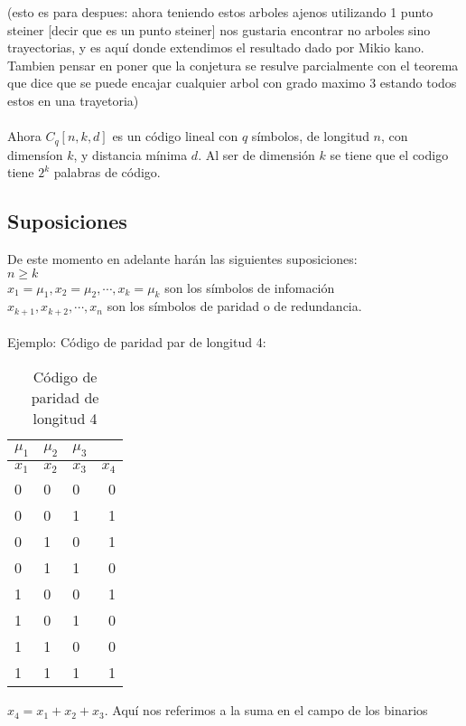 \documentclass[11pt,a4paper]{article}
\begin{document}
(esto es para despues: ahora teniendo estos arboles ajenos utilizando 1 punto steiner [decir que es un punto steiner] nos gustaria encontrar no arboles sino trayectorias, y es aquí donde extendimos el resultado dado por Mikio kano. Tambien pensar en poner que la conjetura se resulve parcialmente con el teorema que dice que se puede encajar cualquier arbol con grado maximo 3 estando todos estos en una trayetoria)
\\\\
Ahora $C_q[n,k,d]$ es un código lineal con $q$ símbolos, de longitud $n$, con dimensíon $k$, y distancia mínima $d$. 
Al ser de dimensión $k$ se tiene que el codigo tiene $2^{k}$ palabras de código.

\subsection{Suposiciones}
De este momento en adelante harán las siguientes suposiciones: 
\\$n \geq k$
\\$x_{1} = \mu_{1}, x_{2} = \mu_{2}, \cdots, x_{k} = \mu_{k}$ son los símbolos de infomación
\\$x_{k+1}, x_{k+2}, \cdots,x_{n}$ son los símbolos de paridad o de redundancia.
\\\\Ejemplo: Código de paridad par de longitud 4:
\begin{table}[h!]
\begin{center}
\caption{Código de paridad de longitud 4}
\label{tab:table1}
\begin{tabular}{l|l|l|r}
\textbf{$\mu_{1}$}&\textbf{$\mu_{2}$}&\textbf{$\mu_{3}$} \\
\hline
$x_{1}$ &$x_{2}$ &$x_{3}$ &$x_{4}$ \\
\hline
0 & 0 & 0 &0\\
0 & 0 & 1 &1\\
0 & 1 & 0 &1\\
0 & 1 & 1 &0\\
1 & 0 & 0 &1\\
1 & 0 & 1 &0\\
1 & 1 & 0 &0\\
1 & 1 & 1 &1\\
\end{tabular}
\end{center}
\end{table}

$x_4 = x_{1} + x_{2} + x_{3}$. Aquí nos referimos a la suma en el campo de los binarios
\end{document}

